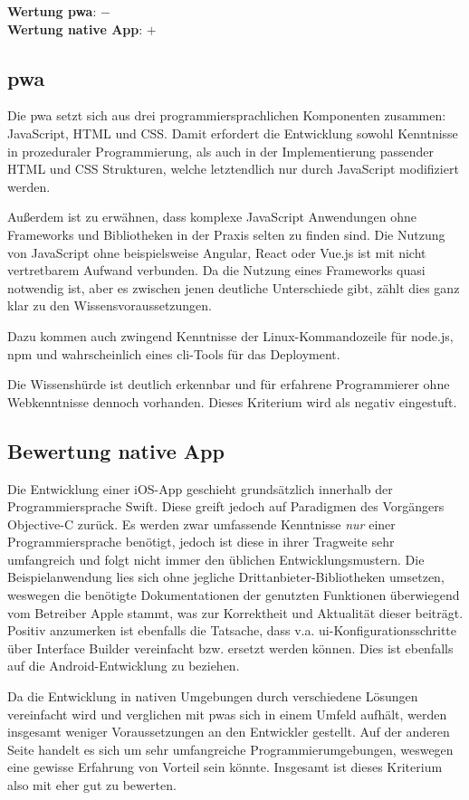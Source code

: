 \textbf{Wertung \ac{pwa}}: $-$\\
\textbf{Wertung native App}: $+$ \\

\subsection{\ac{pwa}}
Die \ac{pwa} setzt sich aus drei programmiersprachlichen Komponenten zusammen: JavaScript, HTML und CSS. Damit erfordert die Entwicklung sowohl Kenntnisse in prozeduraler Programmierung, als auch in der Implementierung passender HTML und CSS Strukturen, welche letztendlich nur durch JavaScript modifiziert werden.

Außerdem ist zu erwähnen, dass komplexe JavaScript Anwendungen ohne Frameworks und Bibliotheken in der Praxis selten zu finden sind. Die Nutzung von JavaScript ohne beispielsweise Angular, React oder Vue.js ist mit nicht vertretbarem Aufwand verbunden. Da die Nutzung eines Frameworks quasi notwendig ist, aber es zwischen jenen deutliche Unterschiede gibt, zählt dies ganz klar zu den Wissensvoraussetzungen.

Dazu kommen auch zwingend Kenntnisse der Linux-Kommandozeile für node.js, npm und wahrscheinlich eines \ac{cli}-Tools für das Deployment.

Die Wissenshürde ist deutlich erkennbar und für erfahrene Programmierer ohne Webkenntnisse dennoch vorhanden. Dieses Kriterium wird als negativ eingestuft.  

\subsection{Bewertung native App}
Die Entwicklung einer iOS-App geschieht grundsätzlich innerhalb der Programmiersprache Swift. Diese greift jedoch auf Paradigmen des Vorgängers Objective-C zurück. Es werden zwar umfassende Kenntnisse \textit{nur} einer Programmiersprache benötigt, jedoch ist diese in ihrer Tragweite sehr umfangreich und folgt nicht immer den üblichen Entwicklungsmustern. Die Beispielanwendung lies sich ohne jegliche Drittanbieter-Bibliotheken umsetzen, weswegen die benötigte Dokumentationen der genutzten Funktionen überwiegend vom Betreiber Apple stammt, was zur Korrektheit und Aktualität dieser beiträgt. Positiv anzumerken ist ebenfalls die Tatsache, dass v.a. \ac{ui}-Konfigurationsschritte über Interface Builder vereinfacht bzw. ersetzt werden können. Dies ist ebenfalls auf die Android-Entwicklung zu beziehen.

Da die Entwicklung in nativen Umgebungen durch verschiedene Lösungen vereinfacht wird und verglichen mit \acp{pwa} sich in einem Umfeld aufhält, werden insgesamt weniger Voraussetzungen an den Entwickler gestellt. Auf der anderen Seite handelt es sich um sehr umfangreiche Programmierumgebungen, weswegen eine gewisse Erfahrung von Vorteil sein könnte. Insgesamt ist dieses Kriterium also mit eher gut zu bewerten.